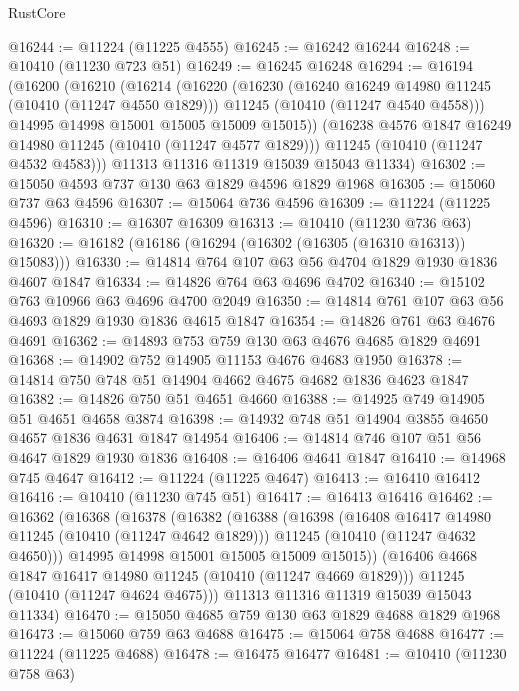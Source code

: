 \begin{lexlean}{RustCore}
\begin{coremodule}
@16244 := @11224 (@11225 @4555)
@16245 := @16242 @16244
@16248 := @10410 (@11230 @723 @51)
@16249 := @16245 @16248
@16294 := @16194
    (@16200
      (@16210
        (@16214
          (@16220
            (@16230
              (@16240 @16249 @14980 @11245 (@10410 (@11247 @4550 @1829)))
              @11245
              (@10410 (@11247 @4540 @4558)))
            @14995
            @14998
            @15001
            @15005
            @15009
            @15015))
        (@16238 @4576 @1847 @16249 @14980 @11245 (@10410 (@11247 @4577 @1829)))
        @11245
        (@10410 (@11247 @4532 @4583)))
      @11313
      @11316
      @11319
      @15039
      @15043
      @11334)
@16302 := @15050 @4593 @737 @130 @63 @1829 @4596 @1829 @1968
@16305 := @15060 @737 @63 @4596
@16307 := @15064 @736 @4596
@16309 := @11224 (@11225 @4596)
@16310 := @16307 @16309
@16313 := @10410 (@11230 @736 @63)
@16320 := @16182 (@16186 (@16294 (@16302 (@16305 (@16310 @16313)) @15083)))
@16330 := @14814 @764 @107 @63 @56 @4704 @1829 @1930 @1836 @4607 @1847
@16334 := @14826 @764 @63 @4696 @4702
@16340 := @15102 @763 @10966 @63 @4696 @4700 @2049
@16350 := @14814 @761 @107 @63 @56 @4693 @1829 @1930 @1836 @4615 @1847
@16354 := @14826 @761 @63 @4676 @4691
@16362 := @14893 @753 @759 @130 @63 @4676 @4685 @1829 @4691
@16368 := @14902 @752 @14905 @11153 @4676 @4683 @1950
@16378 := @14814 @750 @748 @51 @14904 @4662 @4675 @4682 @1836 @4623 @1847
@16382 := @14826 @750 @51 @4651 @4660
@16388 := @14925 @749 @14905 @51 @4651 @4658 @3874
@16398 := @14932 @748 @51 @14904 @3855 @4650 @4657 @1836 @4631 @1847 @14954
@16406 := @14814 @746 @107 @51 @56 @4647 @1829 @1930 @1836
@16408 := @16406 @4641 @1847
@16410 := @14968 @745 @4647
@16412 := @11224 (@11225 @4647)
@16413 := @16410 @16412
@16416 := @10410 (@11230 @745 @51)
@16417 := @16413 @16416
@16462 := @16362
    (@16368
      (@16378
        (@16382
          (@16388
            (@16398
              (@16408 @16417 @14980 @11245 (@10410 (@11247 @4642 @1829)))
              @11245
              (@10410 (@11247 @4632 @4650)))
            @14995
            @14998
            @15001
            @15005
            @15009
            @15015))
        (@16406 @4668 @1847 @16417 @14980 @11245 (@10410 (@11247 @4669 @1829)))
        @11245
        (@10410 (@11247 @4624 @4675)))
      @11313
      @11316
      @11319
      @15039
      @15043
      @11334)
@16470 := @15050 @4685 @759 @130 @63 @1829 @4688 @1829 @1968
@16473 := @15060 @759 @63 @4688
@16475 := @15064 @758 @4688
@16477 := @11224 (@11225 @4688)
@16478 := @16475 @16477
@16481 := @10410 (@11230 @758 @63)

\end{coremodule}
\end{lexlean}
